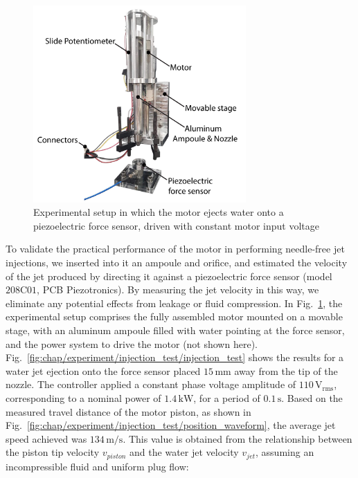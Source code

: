             \begin{figure}[h]
                \centering
                \includegraphics[width=3.2in]{chap5/images/injection_setup.pdf}
                \caption{Experimental setup in which the motor ejects water onto a piezoelectric force sensor, driven with constant motor input voltage}
                \label{fig:chap/experiment/validation/injection_test/injection_setup}
            \end{figure}


            To validate the practical performance of the motor in performing needle-free jet injections, we inserted into it an ampoule and orifice, and estimated the velocity of the jet produced by directing it against a piezoelectric force sensor (model $208\mathrm{C}01$, PCB Piezotronics). By measuring the jet velocity in this way, we eliminate any potential effects from leakage or fluid compression. In Fig.~\ref{fig:chap/experiment/validation/injection_test/injection_setup}, the experimental setup comprises the fully assembled motor mounted on a movable stage, with an aluminum ampoule filled with water pointing at the force sensor, and the power system to drive the motor (not shown here). Fig.~\ref{fig:chap/experiment/injection_test/injection_test} shows the results for a water jet ejection onto the force sensor placed $15\,\mathrm{mm}$ away from the tip of the nozzle. The controller applied a constant phase voltage amplitude of $110\,\mathrm{V_{rms}}$, corresponding to a nominal power of $1.4\,\mathrm{kW}$, for a period of $0.1\,\mathrm{s}$. Based on the measured travel distance of the motor piston, as shown in Fig.~\ref{fig:chap/experiment/injection_test/position_waveform}, the average jet speed achieved was $134\,\mathrm{m/s}$. This value is obtained from the relationship between the piston tip velocity $v_{piston}$ and the water jet velocity $v_{jet}$, assuming an incompressible fluid and uniform plug flow:
            
